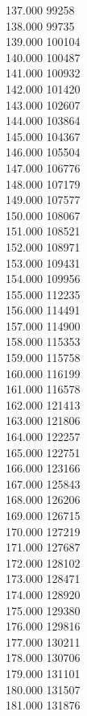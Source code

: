 { 137.000	99258 \\
 138.000	99735 \\
 139.000	100104 \\
 140.000	100487 \\
 141.000	100932 \\
 142.000	101420 \\
 143.000	102607 \\
 144.000	103864 \\
 145.000	104367 \\
 146.000	105504 \\
 147.000	106776 \\
 148.000	107179 \\
 149.000	107577 \\
 150.000	108067 \\
 151.000	108521 \\
 152.000	108971 \\
 153.000	109431 \\
 154.000	109956 \\
 155.000	112235 \\
 156.000	114491 \\
 157.000	114900 \\
 158.000	115353 \\
 159.000	115758 \\
 160.000	116199 \\
 161.000	116578 \\
 162.000	121413 \\
 163.000	121806 \\
 164.000	122257 \\
 165.000	122751 \\
 166.000	123166 \\
 167.000	125843 \\
 168.000	126206 \\
 169.000	126715 \\
 170.000	127219 \\
 171.000	127687 \\
 172.000	128102 \\
 173.000	128471 \\
 174.000	128920 \\
 175.000	129380 \\
 176.000	129816 \\
 177.000	130211 \\
 178.000	130706 \\
 179.000	131101 \\
 180.000	131507 \\
 181.000	131876 \\
}
